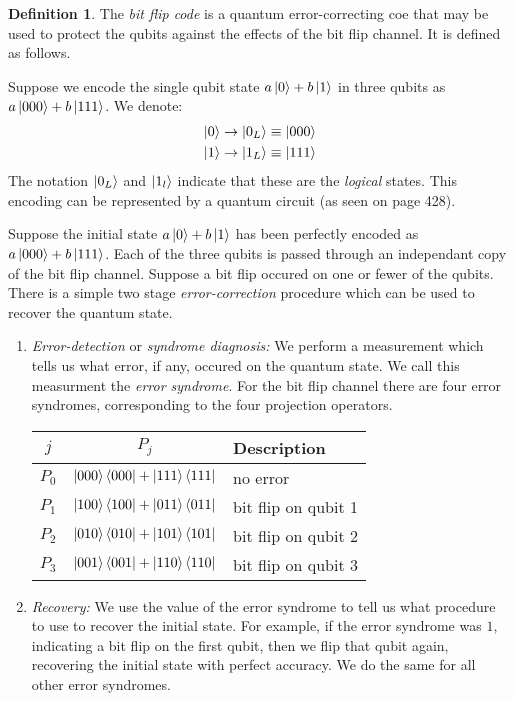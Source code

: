 \documentclass[11pt,a4paper]{article}
\theoremstyle{definition}
\newtheorem{definition}{Definition}[section]
\theoremstyle{plain}
\theoremstyle{remark}
\begin{document}
\begin{definition}
The \emph{bit flip code} is a quantum error-correcting coe that may be used to protect the qubits against the effects of the bit flip channel. It is defined as follows. 

Suppose we encode the single qubit state $a \ket{0} + b \ket{1}$ in three qubits as $a \ket{000} + b \ket{111}$. We denote: 
\begin{align*}
\ket{0} \to \ket{0_L} \equiv \ket{000} \\
\ket{1} \to \ket{1_L} \equiv \ket{111}
\end{align*}
The notation $\ket{0_L}$ and $\ket{1_l}$ indicate that these are the \emph{logical} states. 
This encoding can be represented by a quantum circuit (as seen on page 428).
\end{definition}

Suppose the initial state $a \ket{0} + b \ket{1}$ has been perfectly encoded as $a \ket{000} + b \ket{111}$. 
Each of the three qubits is passed through an independant copy of the bit flip channel. Suppose a bit flip occured on one or fewer of the qubits. There is a simple 
two stage \emph{error-correction} procedure which can be used to recover the quantum state. 

\begin{enumerate}
\item \emph{Error-detection} or \emph{syndrome diagnosis:} We perform a measurement which tells us what error, if any, occured on the quantum state. 
We call this measurment the \emph{error syndrome}. For the bit flip channel there are four error syndromes, corresponding to the four projection operators. 
\center 
\begin{table}[h]
\centering
\begin{tabular}{c|c|l}
\hline
$j$ & $P_j$ & Description \\
\hline
$P_0$ & $\ket{000}\bra{000} + \ket{111}\bra{111}$ & no error \\
$P_1$ & $\ket{100}\bra{100} + \ket{011}\bra{011}$ & bit flip on qubit 1 \\
$P_2$ & $\ket{010}\bra{010} + \ket{101}\bra{101}$ & bit flip on qubit 2 \\
$P_3$ & $\ket{001}\bra{001} + \ket{110}\bra{110}$ & bit flip on qubit 3 \\
\hline
\end{tabular}
\end{table}


\item \emph{Recovery:} We use the value of the error syndrome to tell us what procedure to use 
to recover the initial state. 
For example, if the error syndrome was $1$, indicating a bit flip on the first qubit, then we flip that qubit again, recovering the initial state with perfect accuracy. We do the same for 
all other error syndromes. 
\end{enumerate}
\end{document}
